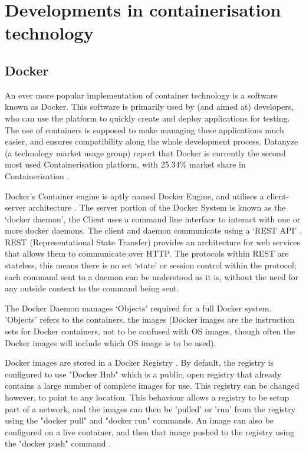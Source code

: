 \section{Developments in containerisation technology}

\subsection{Docker}
\label{subsec:docker}
An ever more popular implementation of container technology is a software known as Docker. This software is primarily used by (and aimed at) developers, who can use the platform to quickly create and deploy applications for testing. The use of containers is supposed to make managing these applications much easier, and ensures compatibility along the whole development process.
Datanyze (a technology market usage group) report that Docker is currently the second most used Containerisation platform, with 25.34\% market share in Containerisation \citep{datanyze}. 

Docker's Container engine is aptly named Docker Engine, and utilises a client-server architecture \citep[Section: Docker architecture]{DockerOverview}. The server portion of the Docker System is known as the `docker daemon', the Client uses a command line interface to interact with one or more docker daemons. The client and daemon communicate using a `REST API' \citep[Section: The Docker daemon]{DockerOverview}. REST (Representational State Transfer) provides an architecture for web services \citep{W3Architecture2004} that allows them to communicate over HTTP. The protocols within REST are stateless, this means there is no set `state' or session control within the protocol; each command sent to a daemon can be understood as it is, without the need for any outside context to the command being sent.

The Docker Daemon manages `Objects' \citep[Section: Docker objects]{DockerOverview} required for a full Docker system. 'Objects' refers to the containers, the images (Docker images are the instruction sets for Docker containers, not to be confused with OS images, though often the Docker images will include which OS image is to be used).

Docker images are stored in a Docker Registry \citep[Section: Docker registries]{DockerOverview}. By default, the registry is configured to use "Docker Hub" which is a public, open registry that already contains a large number of complete images for use. This registry can be changed however, to point to any location. This behaviour allows a registry to be setup part of a network, and the images can then be 'pulled' or 'run' from the registry using the "docker pull" and "docker run" commands\citep[Section: Docker registries]{DockerOverview}. An image can also be configured on a live container, and then that image pushed to the registry using the "docker push" command \citep[Section: Docker registries]{DockerOverview}.

